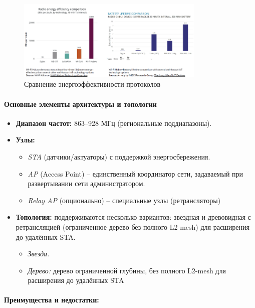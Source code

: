 \documentclass[14pt,a4paper]{extarticle}
\begin{document}
\begin{figure}[h]
    \centering
    \includegraphics[width=0.8\textwidth]{images/WiFiEnergyEff.png}
    \caption{Сравнение энергоэффективности протоколов \cite{IMG_protocol_compare_power_eff}}
    \label{fig:wifi_energy_eff}
\end{figure}

\paragraph{Основные элементы архитектуры и топологии}
\begin{itemize}
  \item \textbf{Диапазон частот:} 863–928 МГц (региональные поддиапазоны).
  \item \textbf{Узлы:} 
    \begin{itemize}
      \item \emph{STA} (датчики/актуаторы) с поддержкой энергосбережения.
      \item \emph{AP} (Access Point) -- единственный координатор сети, задаваемый при развертывании сети администратором.
      \item \emph{Relay AP} (опционально) -- специальные узлы (ретрансляторы)
    \end{itemize}
  \item \textbf{Топология:} поддерживаются несколько вариантов: звездная и древовидная с ретрансляцией (ограниченное дерево без полного L2-mesh) для расширения до удалённых STA.
    \begin{itemize}
      \item \emph{Звезда.}
      \item \emph{Дерево:} дерево ограниченной глубины, без полного L2-mesh для расширения до удалённых STA
    \end{itemize}
\end{itemize}

\paragraph{Преимущества и недостатки:}
\end{document}
